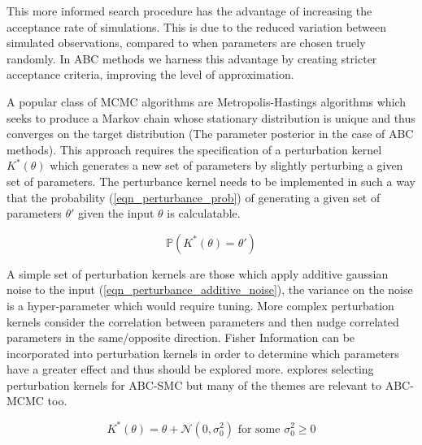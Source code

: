\documentclass[11pt,a4paper]{article}
\newcommand*{\prob}{\mathbb{P}}
\theoremstyle{break}
\begin{document}
  \par This more informed search procedure has the advantage of increasing the acceptance rate of simulations. This is due to the reduced variation between simulated observations, compared to when parameters are chosen truely randomly. In ABC methods we harness this advantage by creating stricter acceptance criteria, improving the level of approximation.

  \par A popular class of MCMC algorithms are Metropolis-Hastings algorithms \cite[]{equation_of_state_calculations_by_fast_computing_machines,monte_carlo_methods_using_markov_chains_and_their_applications} which seeks to produce a Markov chain whose stationary distribution is unique and thus converges on the target distribution (The parameter posterior in the case of ABC methods). This approach requires the specification of a perturbation kernel $K^*(\theta)$ which generates a new set of parameters by slightly perturbing a given set of parameters. The perturbance kernel needs to be implemented in such a way that the probability (\ref{eqn_perturbance_prob}) of generating a given set of parameters $\theta'$ given the input $\theta$ is calculatable.

  \begin{equation}\label{eqn_perturbance_prob}
    \prob\left(K^*(\theta)=\theta'\right)
  \end{equation}

  \par A simple set of perturbation kernels are those which apply additive gaussian noise to the input (\ref{eqn_perturbance_additive_noise}), the variance on the noise is a hyper-parameter which would require tuning. More complex perturbation kernels consider the correlation between parameters and then nudge correlated parameters in the same/opposite direction. Fisher Information can be incorporated into perturbation kernels in order to determine which parameters have a greater effect and thus should be explored more. \cite[]{on_optimality_of_kernels_for_approximate_bayesian_computation_using_SMC} explores selecting perturbation kernels for ABC-SMC but many of the themes are relevant to ABC-MCMC too.

  \begin{equation}\label{eqn_perturbance_additive_noise}
    K^*(\theta)=\theta+\mathcal{N}(0,\sigma_0^2)\text{ for some }\sigma_0^2\geq0
  \end{equation}
\end{document}
